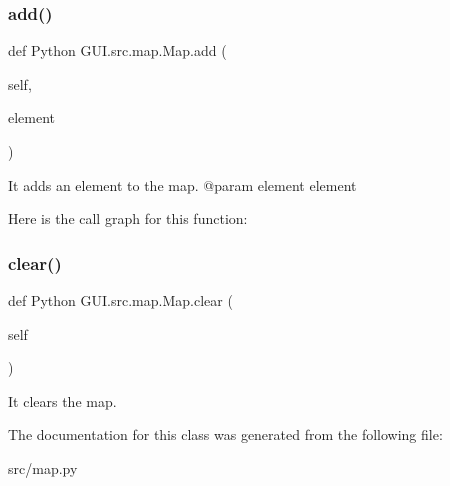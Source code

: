 \subsubsection{\texorpdfstring{add()}{add()}}
{\footnotesize\ttfamily def Python G\+U\+I.\+src.\+map.\+Map.\+add (\begin{DoxyParamCaption}\item[{}]{self,  }\item[{}]{element }\end{DoxyParamCaption})}

\begin{DoxyVerb}It adds an element to the map.
    @param element    element
\end{DoxyVerb}
 Here is the call graph for this function\+:
\mbox{\label{class_python_01_g_u_i_1_1src_1_1map_1_1_map_ac4f7448296c4d3104681bdb144e5befa}} 
\subsubsection{\texorpdfstring{clear()}{clear()}}
{\footnotesize\ttfamily def Python G\+U\+I.\+src.\+map.\+Map.\+clear (\begin{DoxyParamCaption}\item[{}]{self }\end{DoxyParamCaption})}

\begin{DoxyVerb}It clears the map.
\end{DoxyVerb}
 

The documentation for this class was generated from the following file\+:\begin{DoxyCompactItemize}
\item 
src/map.\+py\end{DoxyCompactItemize}
